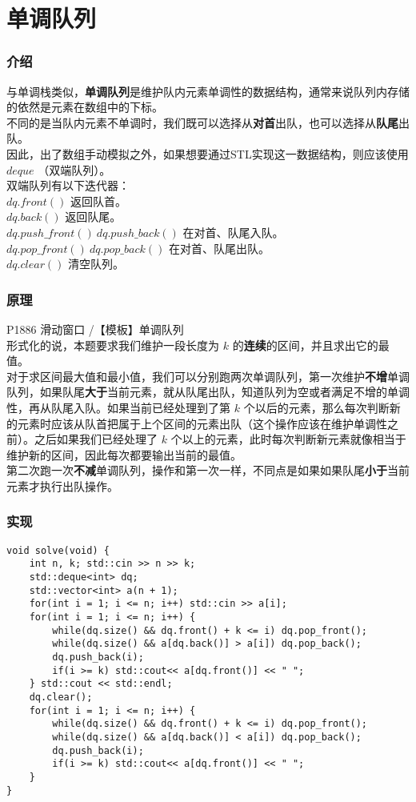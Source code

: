 \documentclass{beamer}
\newcommand{\fdf}[1]{\alert{\textbf{#1}}}
\begin{document}
\section{单调队列}
\begin{frame}
\frametitle{介绍}
与单调栈类似，\fdf{单调队列}是维护队内元素单调性的数据结构，通常来说队列内存储的依然是元素在数组中的下标。\\ 
不同的是当队内元素不单调时，我们既可以选择从\fdf{对首}出队，也可以选择从\fdf{队尾}出队。\\ 
因此，出了数组手动模拟之外，如果想要通过STL实现这一数据结构，则应该使用	 $deque$ （双端队列）。\\
双端队列有以下迭代器：\\ 
$dq.front()$ 返回队首。\\ 
$dq.back()$ 返回队尾。 \\ 
$dq.push\_front() \ dq.push\_back()$ 在对首、队尾入队。 \\ 
$dq.pop\_front() \ dq.pop\_back()$ 在对首、队尾出队。 \\ 
$dq.clear()$ 清空队列。
\end{frame}
\begin{frame}
\frametitle{原理}
P1886 滑动窗口 /【模板】单调队列\\
形式化的说，本题要求我们维护一段长度为 $k$ 的\fdf{连续}的区间，并且求出它的最值。\\
对于求区间最大值和最小值，我们可以分别跑两次单调队列，第一次维护\fdf{不增}单调队列，如果队尾\fdf{大于}当前元素，就从队尾出队，知道队列为空或者满足不增的单调性，再从队尾入队。如果当前已经处理到了第 $k$ 个以后的元素，那么每次判断新的元素时应该从队首把属于上个区间的元素出队（这个操作应该在维护单调性之前）。之后如果我们已经处理了 $k$ 个以上的元素，此时每次判断新元素就像相当于维护新的区间，因此每次都要输出当前的最值。\\ 
第二次跑一次\fdf{不减}单调队列，操作和第一次一样，不同点是如果如果队尾\fdf{小于}当前元素才执行出队操作。
\end{frame}
\begin{frame}[fragile]
\frametitle{实现}
\begin{onlyenv}
\begin{verbatim}
void solve(void) {
    int n, k; std::cin >> n >> k;
    std::deque<int> dq;
    std::vector<int> a(n + 1);
    for(int i = 1; i <= n; i++) std::cin >> a[i];
    for(int i = 1; i <= n; i++) {
        while(dq.size() && dq.front() + k <= i) dq.pop_front();
        while(dq.size() && a[dq.back()] > a[i]) dq.pop_back();
        dq.push_back(i);
        if(i >= k) std::cout<< a[dq.front()] << " ";
    } std::cout << std::endl;
    dq.clear();
    for(int i = 1; i <= n; i++) {
        while(dq.size() && dq.front() + k <= i) dq.pop_front();
        while(dq.size() && a[dq.back()] < a[i]) dq.pop_back();
        dq.push_back(i);
        if(i >= k) std::cout<< a[dq.front()] << " ";
    }
}
\end{verbatim}
\end{onlyenv}
\end{frame}
\end{document}

